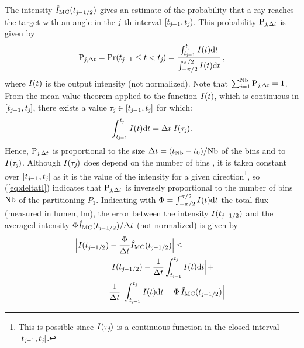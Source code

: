 The intensity $\hat{I}_{\textrm{MC}}(t_{\textit{j}-1/2})$ gives an estimate of the probability that a ray reaches the target with an angle in the $\textit{j}$-th interval
$[t_{\textit{j}-1}, t_{\textit{j}})$. This probability $\textrm{P}_{\textit{j}, \Delta t}$ is given by
\begin{equation}\label{eq:probability}
\textrm{P}_{\textit{j}, \Delta t} = \Pr(t_{\textit{j}-1}\leq t<t_{\textit{j}})=
\frac{\int_{t_{\textit{j}-1}}^{t_{\textit{j}}} I(t) \textrm{d}t}{\int_{-\pi/2}^{\pi/2}I(t) \textrm{d}t}\,,
\end{equation}
where $I(t)$ is the output intensity (not normalized).
Note that $\sum_{\textit{j}=1}^{\textrm{Nb}}\textrm{P}_{\textit{j}, \Delta t}=1$. From the mean value theorem applied to the function
$I(t)$, which is continuous in $[t_{\textit{j}-1}, t_{\textit{j}}]$, there exists a value $\tau_{\textit{j}}\in[t_{\textit{j}-1}, t_{\textit{j}}]$ for which:
 \begin{equation}\label{eq:deltatI}
\int_{t_{\textit{j}-1}}^{t_{\textit{j}}} I(t) \textrm{d}t = \Delta t\;I(\tau_{\textit{j}}).
\end{equation}
Hence, $\textrm{P}_{\textit{j}, \Delta t}$ is proportional to the size $\Delta t= (t_{\textrm{Nb}}-t_{0})/{\textrm{Nb}}$
of the bins and to $I(\tau_{\textit{j}})$. Although $I(\tau_{\textit{j}})$ does depend on the number of bins \nbin, it is taken constant over $[t_{\textit{j}-1}, t_{\textit{j}}]$ as it is the value of the intensity for a given direction\footnote{This is possible since $I(\tau_{\textit{j}})$ is a continuous function in the closed interval $[t_{\textit{j}-1}, t_{\textit{j}}]$.}, so (\ref{eq:deltatI}) indicates that $\textrm{P}_{\textit{j}, \Delta t}$ is inversely proportional to the number of bins $\textrm{Nb}$ of the partitioning $P_1$.
Indicating with $\Phi = \int_{-\pi/2}^{\pi/2}I(t) \textrm{d}t$ the total flux (measured in lumen, $\textrm{lm}$),
the error between the intensity $I(t_{\textit{j}-1/2})$ and the averaged  intensity $\Phi \hat{I}_{\textrm{MC}}(t_{\textit{j}-1/2})/\Delta t$ (not normalized) is given by
\begin{equation}\label{eq:error_int}
\begin{aligned}
\Big|I(t_{\textit{j}-1/2})&-\frac{\Phi}
{\Delta t}\hat{I}_{\textrm{MC}}(t_{\textit{j}-1/2})\Big| \leq\\
 &\Big|I(t_{\textit{j}-1/2})-\frac{1}{\Delta t}\int_{t_{\textit{j}-1}}^{t_{\textit{j}}} I(t)\textrm{d}t\Big|+\\
&\frac{1}{\Delta t}\Big|\int_{t_{\textit{j}-1}}^{t_{\textit{j}}} I(t)\textrm{d}t-
\Phi\, \hat{I}_{\textrm{MC}}(t_{\textit{j}-1/2})\Big| \,.
\end{aligned}
\end{equation}
